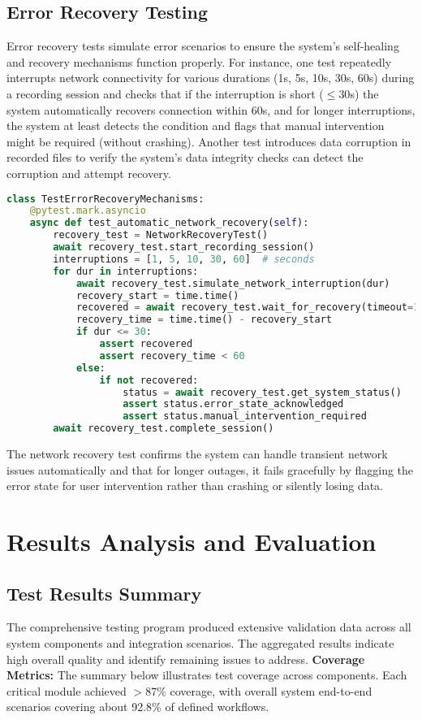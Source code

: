 \documentclass[11pt,a4paper]{report}
\begin{document}
\subsection{Error Recovery Testing}
Error recovery tests simulate error scenarios to ensure the system’s self-healing and recovery mechanisms function properly. For instance, one test repeatedly interrupts network connectivity for various durations (1s, 5s, 10s, 30s, 60s) during a recording session and checks that if the interruption is short ($\leq 30$s) the system automatically recovers connection within 60s, and for longer interruptions, the system at least detects the condition and flags that manual intervention might be required (without crashing). Another test introduces data corruption in recorded files to verify the system’s data integrity checks can detect the corruption and attempt recovery.
\begin{lstlisting}[language=Python]
class TestErrorRecoveryMechanisms:
    @pytest.mark.asyncio
    async def test_automatic_network_recovery(self):
        recovery_test = NetworkRecoveryTest()
        await recovery_test.start_recording_session()
        interruptions = [1, 5, 10, 30, 60]  # seconds
        for dur in interruptions:
            await recovery_test.simulate_network_interruption(dur)
            recovery_start = time.time()
            recovered = await recovery_test.wait_for_recovery(timeout=120)
            recovery_time = time.time() - recovery_start
            if dur <= 30:
                assert recovered
                assert recovery_time < 60
            else:
                if not recovered:
                    status = await recovery_test.get_system_status()
                    assert status.error_state_acknowledged
                    assert status.manual_intervention_required
        await recovery_test.complete_session()
\end{lstlisting}
The network recovery test confirms the system can handle transient network issues automatically and that for longer outages, it fails gracefully by flagging the error state for user intervention rather than crashing or silently losing data.
\section{Results Analysis and Evaluation}
\subsection{Test Results Summary}
The comprehensive testing program produced extensive validation data across all system components and integration scenarios. The aggregated results indicate high overall quality and identify remaining issues to address.
\textbf{Coverage Metrics:} The summary below illustrates test coverage across components. Each critical module achieved $>$87\% coverage, with overall system end-to-end scenarios covering about 92.8\% of defined workflows.
\end{document}

